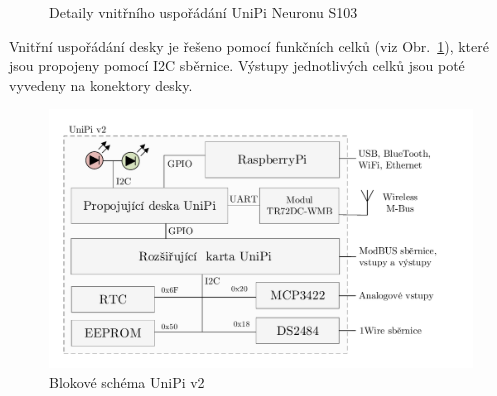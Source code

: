 \begin{figure}[!ht]
		\centering
			\hspace*{5mm}
			\caption{Detaily vnitřního uspořádání UniPi Neuronu S103}
			\vspace{-5pt}
\end{figure}

Vnitřní uspořádání desky je řešeno pomocí funkčních celků (viz Obr.~\ref{BlokUniPi2Schema}), které jsou propojeny pomocí I2C sběrnice. Výstupy jednotlivých celků jsou poté vyvedeny na konektory desky.
 \begin{figure}[!ht]
	\vspace{-10pt}
  \begin{center}
    \includegraphics[scale=0.75]{obrazky/unipi_schema2}
  \end{center}
	\vspace{-30pt}
	\caption{Blokové schéma UniPi v2}
	\label{BlokUniPi2Schema}
	\vspace{-10pt}
\end{figure}

